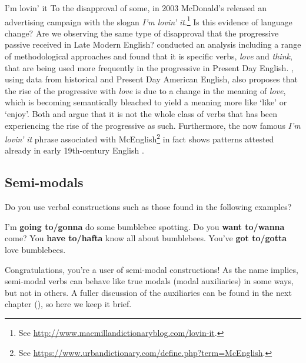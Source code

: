 \begin{miscbox}{I'm lovin' it}
To the disapproval of some, in 2003 McDonald's released an advertising campaign with the slogan \textit{I'm lovin' it}.\footnote{See \url{http://www.macmillandictionaryblog.com/lovin-it}.} Is this evidence of language change? Are we observing the same type of disapproval that the progressive passive received in Late Modern English? \citet{Freund2016} conducted an analysis including a range of methodological approaches and found that it is specific verbs, \textit{love} and \textit{think}, that are being used more frequently in the progressive in Present Day English. \citet{Anderwald2017}, using  data from historical and Present Day American English, also proposes that the rise of the progressive with \textit{love} is due to a change in the meaning of \textit{love}, which is becoming semantically bleached to yield a meaning more like `like' or `enjoy'. Both \citet{Freund2016} and \citet{Anderwald2017} argue that it is not the whole class of  verbs that has been experiencing the rise of the progressive as such. Furthermore, the now famous \textit{I'm lovin' it} phrase associated with McEnglish\footnote{See \url{https://www.urbandictionary.com/define.php?term=McEnglish}.} in fact shows patterns attested already in early 19th-century English \citep[162--163]{AartsCloseWallis2010}.
\end{miscbox}


\subsection{Semi-modals}\label{LME-semimodals}
Do you use verbal constructions such as those found in the following examples?

\begin{exe}
    \ex\label{ex-gonna} I'm \textbf{going to/gonna} do some bumblebee spotting.
    \ex Do you \textbf{want to/wanna} come?
    \ex You \textbf{have to/hafta} know all about bumblebees.
    \ex\label{ex-gotta} You've \textbf{got to/gotta} love bumblebees.
\end{exe}

\noindent Congratulations, you're a user of semi-modal constructions! As the name implies, semi-modal verbs can behave like true modals (modal auxiliaries) in some ways, but not in others. A fuller discussion of the auxiliaries can be found in the next chapter (), so here we keep it brief.

